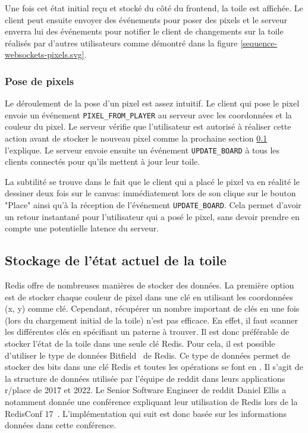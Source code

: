 Une fois cet état initial reçu et stocké du côté du frontend, la toile est affichée. Le client peut ensuite envoyer des événements pour poser des pixels et le serveur enverra lui des événements pour notifier le client de changements sur la toile réalisés par d'autres utilisateurs comme démontré dans la figure \ref{sequence-websockets-pixels.svg}.

\subsubsection{Pose de pixels}


Le déroulement de la pose d'un pixel est assez intuitif. Le client qui pose le pixel envoie un événement \texttt{PIXEL\_FROM\_PLAYER} au serveur avec les coordonnées et la couleur du pixel. Le serveur vérifie que l'utilisateur est autorisé à réaliser cette action avant de stocker le nouveau pixel comme la prochaine section \ref{section:stockage} l'explique. Le serveur envoie ensuite un événement \texttt{UPDATE\_BOARD} à tous les clients connectés pour qu'ils mettent à jour leur toile.

La subtilité se trouve dans le fait que le client qui a placé le pixel va en réalité le dessiner deux fois sur le canvas: immédiatement lors de son clique sur le bouton "Place" ainsi qu'à la réception de l'événement \texttt{UPDATE\_BOARD}. Cela permet d'avoir un retour instantané pour l'utilisateur qui a posé le pixel, sans devoir prendre en compte une potentielle latence du serveur.

\subsection{Stockage de l'état actuel de la toile}
\label{section:stockage}

Redis offre de nombreuses manières de stocker des données. La première option est de stocker chaque couleur de pixel dans une clé en utilisant les coordonnées (x, y) comme clé. Cependant, récupérer un nombre important de clés en une fois (lors du chargement initial de la toile) n'est pas efficace. En effet, il faut scanner les différentes clés en spécifiant un paterne à trouver. Il est donc préférable de stocker l'état de la toile dans une seule clé Redis. Pour cela, il est possible d'utiliser le type de données Bitfield~\cite{bitfield} de Redis. Ce type de données permet de stocker des bits dans une clé Redis et toutes les opérations se font en . Il s'agit de la structure de données utilisée par l'équipe de \gls{reddit} dans leurs applications r/place de 2017 et 2022. Le Senior Software Engineer de \gls{reddit} Daniel Ellis a notamment donnée une conférence expliquant leur utilisation de Redis lors de la RedisConf 17~\cite{redisconf}. L'implémentation qui suit est donc basée sur les informations données dans cette conférence.

